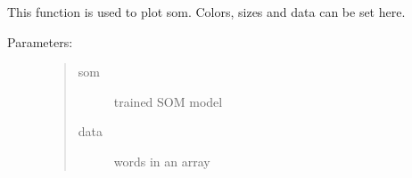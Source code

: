 \documentclass[letterpaper,10pt,english]{sphinxmanual}
\begin{document}
\begin{fulllineitems}
\label{\detokenize{som:som.plotSom}}
\pysigstartsignatures
{}
\pysigstopsignatures
\sphinxAtStartPar
This function is used to plot som. Colors, sizes and data can be set here.
\begin{description}
\item[{Parameters:}] \leavevmode\begin{quote}\begin{description}
\item[{som}] \leavevmode
\sphinxAtStartPar
trained SOM model

\item[{data}] \leavevmode
\sphinxAtStartPar
words in an array

\end{description}\end{quote}

\end{description}

\end{fulllineitems}

\end{document}
